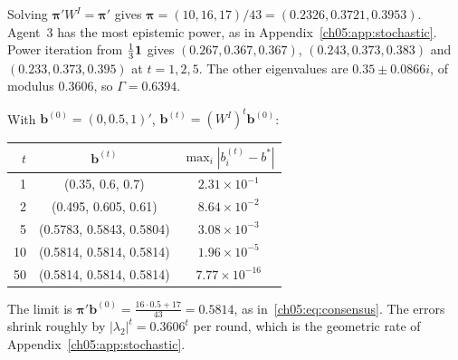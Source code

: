 \documentclass[../solutions_manual.tex]{subfiles}
\begin{document}
 Solving $\boldsymbol\pi'W^I = \boldsymbol\pi'$ gives $\boldsymbol\pi = (10, 16, 17)/43 = (0.2326, 0.3721, 0.3953)$. Agent~3 has the most epistemic power, as in Appendix~\ref{ch05:app:stochastic}. Power iteration from $\frac13\mathbf{1}$ gives $(0.267, 0.367, 0.367)$, $(0.243, 0.373, 0.383)$ and $(0.233, 0.373, 0.395)$ at $t = 1, 2, 5$. The other eigenvalues are $0.35 \pm 0.0866i$, of modulus $0.3606$, so $\Gamma = 0.6394$.

 With $\mathbf b^{(0)} = (0, 0.5, 1)'$, $\mathbf b^{(t)} = (W^I)^t\mathbf b^{(0)}$:
\begin{center}
\begin{tabular}{rcc}
\toprule
$t$ & $\mathbf b^{(t)}$ & $\max_i|b_i^{(t)} - b^*|$\\
\midrule
1 & (0.35, 0.6, 0.7) & $2.31\times10^{-1}$\\
2 & (0.495, 0.605, 0.61) & $8.64\times10^{-2}$\\
5 & (0.5783, 0.5843, 0.5804) & $3.08\times10^{-3}$\\
10 & (0.5814, 0.5814, 0.5814) & $1.96\times10^{-5}$\\
50 & (0.5814, 0.5814, 0.5814) & $7.77\times10^{-16}$\\
\bottomrule
\end{tabular}
\end{center}
The limit is $\boldsymbol\pi'\mathbf b^{(0)} = \frac{16\cdot0.5 + 17}{43} = 0.5814$, as in~\eqref{ch05:eq:consensus}. The errors shrink roughly by $|\lambda_2|^t = 0.3606^t$ per round, which is the geometric rate of Appendix~\ref{ch05:app:stochastic}.

\end{document}

